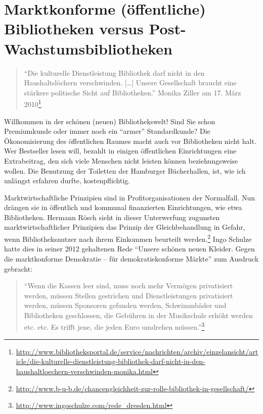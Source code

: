 \documentclass[a4paper,
fontsize=11pt,
oneside,
numbers=noperiodatend,
parskip=half-,
bibliography=totoc,
final
]{scrartcl}
\begin{document}
\section{Marktkonforme (öffentliche) Bibliotheken versus
Post-Wachstumsbibliotheken}\label{marktkonforme-uxf6ffentliche-bibliotheken-versus-post-wachstumsbibliotheken}

\begin{quote}
\enquote{Die kulturelle Dienstleistung Bibliothek darf nicht in den
Haushaltslöchern verschwinden. {[}\ldots{}{]} Unsere Gesellschaft
braucht eine stärkere politische Sicht auf Bibliotheken.} Monika Ziller
am 17. März 2010\footnote{\url{http://www.bibliotheksportal.de/service/nachrichten/archiv/einzelansicht/article/die-kulturelle-dienstleistung-bibliothek-darf-nicht-in-den-haushaltloechern-verschwinden-monika.html}}
\end{quote}

Willkommen in der schönen (neuen) Bibliothekswelt! Sind Sie schon
Premiumkunde oder immer noch ein \enquote{armer} Standardkunde? Die
Ökonomisierung des öffentlichen Raumes macht auch vor Bibliotheken nicht
halt. Wer Bestseller lesen will, bezahlt in einigen öffentlichen
Einrichtungen eine Extrabeitrag, den sich viele Menschen nicht leisten
können beziehungsweise wollen. Die Benutzung der Toiletten der Hamburger
Bücherhallen, ist, wie ich unlängst erfahren durfte, kostenpflichtig.

Marktwirtschaftliche Prinzipien sind in Profitorganisationen der
Normalfall. Nun drängen sie in öffentlich und kommunal finanzierten
Einrichtungen, wie etwa Bibliotheken. Hermann Rösch sieht in dieser
Unterwerfung zugunsten marktwirtschaftlicher Prinzipien das Prinzip der
Gleichbehandlung in Gefahr, wenn Bibliotheksnutzer nach ihrem Einkommen
beurteilt werden.\footnote{\url{http://www.b-u-b.de/chancengleichheit-zur-rolle-bibliothek-in-gesellschaft/}}
Ingo Schulze hatte dies in seiner 2012 gehaltenen Rede \enquote{Unsere
schönen neuen Kleider. Gegen die marktkonforme Demokratie -- für
demokratiekonforme Märkte} zum Ausdruck gebracht:~

\begin{quote}
\enquote{Wenn die Kassen leer sind, muss noch mehr Vermögen privatisiert
werden, müssen Stellen gestrichen und Dienstleistungen privatisiert
werden, müssen Sponsoren gefunden werden, Schwimmbäder und Bibliotheken
geschlossen, die Gebühren in der Musikschule erhöht werden etc. etc. Es
trifft jene, die jeden Euro umdrehen müssen.}\footnote{\url{http://www.ingoschulze.com/rede\_dresden.html}}
\end{quote}
\end{document}
